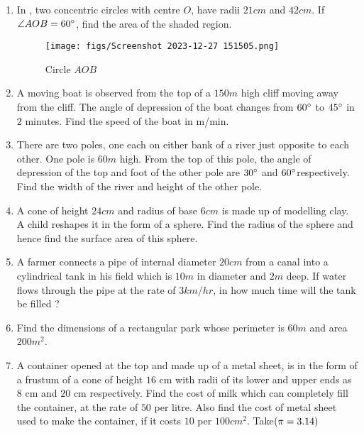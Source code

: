\begin{enumerate}
\item In , two concentric circles with centre $O$, have radii $21 cm$ and $42 cm$. If $\angle AOB = 60\degree$, find the area of the shaded region.
\begin{figure}[H]
    \centering
    \texttt{[image: figs/Screenshot 2023-12-27 151505.png]}
    \caption{Circle $AOB$ }
    \label{fig:Fig_1}
\end{figure}

\item A moving boat is observed from the top of a $150m$ high cliff moving away from the cliff. The angle of depression of the boat changes from $60\degree$ to $45\degree$ in $2$ minutes. Find the speed of the boat in m/min.

\item There are two poles, one each on either bank of a river just opposite to each other. One pole is $60m$ high. From the top of this pole, the angle of depression of the top and foot of the other pole are $30\degree$ and $60\degree$respectively. Find the width of the river and height of the other pole.

\item A cone of height $24 cm$ and radius of base $6 cm$ is made up of modelling clay. A child reshapes it in the form of a sphere. Find the radius of the sphere and hence find the surface area of this sphere.

\item A farmer connects a pipe of internal diameter $20 cm$ from a canal into a cylindrical tank in his field which is $10 m$ in diameter and $2 m$ deep. If water flows through the pipe at the rate of $3 km/hr$, in how much time will the tank be filled ?

\item Find the dimensions of a rectangular park whose perimeter is $60 m$ and area $200 m^2$.

\item A container opened at the top and made up of a metal sheet, is in the form of a frustum of a cone of height $16$ cm with radii of its lower and upper ends as $8$ cm and $20$ cm respectively. Find the cost of milk which can completely fill the container, at the rate of \rupee $50$ per litre. Also find the cost of metal sheet used to make the container, if it costs \rupee$ 10$ per $100 cm^2$. Take$\left(\pi = 3.14\right)$

\end{enumerate}

